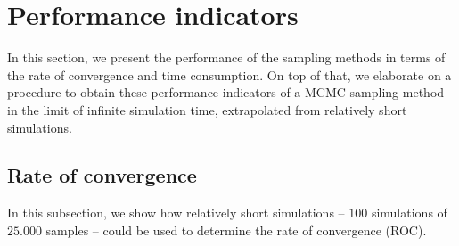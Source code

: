 \documentclass[a4paper, twoside, 11pt]{report}
\theoremstyle{plain}
\theoremstyle{definition}
\theoremstyle{remark}
\begin{document}
\section{Performance indicators}
In this section, we present the performance of the sampling methods in terms of the rate of convergence and time consumption. On top of that, we elaborate on a procedure to obtain these performance indicators of a MCMC sampling method in the limit of infinite simulation time, extrapolated from relatively short simulations.

\subsection{Rate of convergence}
In this subsection, we show how relatively short simulations -- $100$ simulations of $25.000$ samples -- could be used to determine the rate of convergence (ROC). \\
\end{document}
